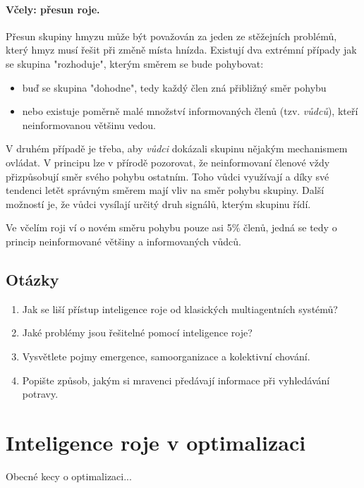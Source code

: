 \documentclass[a4paper,12pt]{article}
\begin{document}
\paragraph{Včely: přesun roje.}
Přesun skupiny hmyzu může být považován za jeden ze stěžejních problémů, který hmyz musí
řešit při změně místa hnízda. Existují dva extrémní případy jak se skupina "rozhoduje", kterým
směrem se bude pohybovat\cite{Blum08SwarmInt}:
\begin{itemize}
  \item buď se skupina "dohodne", tedy každý člen zná přibližný směr pohybu
  \item nebo existuje poměrně malé množství informovaných členů (tzv. {\it vůdců}), kteří
        neinformovanou většinu vedou.
\end{itemize}
V druhém případě je třeba, aby {\it vůdci} dokázali skupinu nějakým mechanismem ovládat. V principu
lze v přírodě pozorovat, že neinformovaní členové vždy přizpůsobují směr svého pohybu ostatním.
Toho vůdci využívají a díky své tendenci letět správným směrem mají vliv na směr pohybu skupiny.
Další možností je, že vůdci vysílají určitý druh signálů, kterým skupinu řídí.

Ve včelím roji ví o novém směru pohybu pouze asi 5\% členů, jedná se tedy o princip neinformované
většiny a informovaných vůdců.


\subsection{Otázky}
\begin{enumerate}
  \item Jak se liší přístup inteligence roje od klasických multiagentních systémů?
  \item Jaké problémy jsou řešitelné pomocí inteligence roje?
  \item Vysvětlete pojmy emergence, samoorganizace a kolektivní chování.
  \item Popište způsob, jakým si mravenci předávají informace při vyhledávání potravy.
\end{enumerate}

\newpage



\section{Inteligence roje v optimalizaci}
Obecné kecy o optimalizaci...
\end{document}
